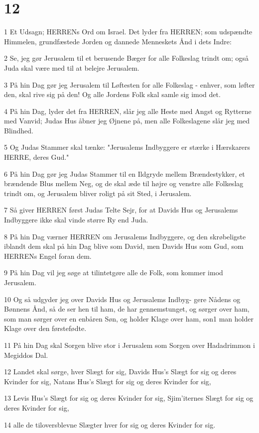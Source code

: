 \chapter{12}

\par 1 Et Udsagn; HERRENs Ord om Israel. Det lyder fra HERREN; som udspændte Himmelen, grundfæstede Jorden og dannede Menneskets Ånd i dets Indre:
\par 2 Se, jeg gør Jerusalem til et berusende Bæger for alle Folkeslag trindt om; også Juda skal være med til at belejre Jerusalem.
\par 3 På hin Dag gør jeg Jerusalem til Løftesten for alle Folkeslag - enhver, som løfter den, skal rive sig på den! Og alle Jordens Folk skal samle sig imod det.
\par 4 På hin Dag, lyder det fra HERREN, slår jeg alle Heste med Angst og Rytterne med Vanvid; Judas Hus åbner jeg Øjnene på, men alle Folkeslagene slår jeg med Blindhed.
\par 5 Og Judas Stammer skal tænke: "Jerusalems Indbyggere er stærke i Hærskarers HERRE, deres Gud."
\par 6 På hin Dag gør jeg Judas Stammer til en Ildgryde mellem Brændestykker, et brændende Blus mellem Neg, og de skal æde til højre og venstre alle Folkeslag trindt om, og Jerusalem bliver roligt på sit Sted, i Jerusalem.
\par 7 Så giver HERREN først Judas Telte Sejr, for at Davids Hus og Jerusalems Indbyggere ikke skal vinde større Ry end Juda.
\par 8 På hin Dag værner HERREN om Jerusalems Indbyggere, og den skrøbeligste iblandt dem skal på hin Dag blive som David, men Davids Hus som Gud, som HERRENs Engel foran dem.
\par 9 På hin Dag vil jeg søge at tilintetgøre alle de Folk, som kommer imod Jerusalem.
\par 10 Og så udgyder jeg over Davids Hus og Jerusalems Indbyg- gere Nådens og Bønnens Ånd, så de ser hen til ham, de har gennemstunget, og sørger over ham, som man sørger over en enbåren Søn, og holder Klage over ham, son1 man holder Klage over den førstefødte.
\par 11 På hin Dag skal Sorgen blive stor i Jerusalem som Sorgen over Hadadrimmon i Megiddos Dal.
\par 12 Landet skal sørge, hver Slægt for sig, Davids Hus's Slægt for sig og deres Kvinder for sig, Natans Hus's Slægt for sig og deres Kvinder for sig,
\par 13 Levis Hus's Slægt for sig og deres Kvinder for sig, Sjim'iternes Slægt for sig og deres Kvinder for sig,
\par 14 alle de tiloversblevne Slægter hver for sig og deres Kvinder for sig.

